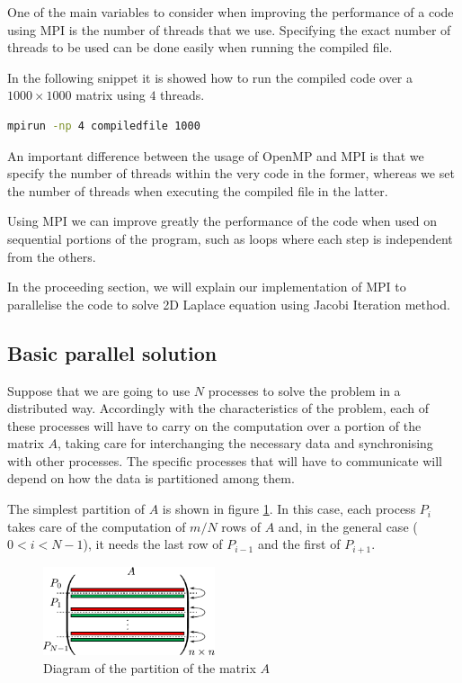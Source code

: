 One of the main variables to consider when improving the performance of a code using MPI is the number of threads that we use. Specifying the exact number of threads to be used can be done easily when running the compiled  file. 

In the following snippet it is showed how to run the compiled code over a $1000 \times 1000$ matrix using $4$ threads.

\begin{lstlisting}[language=bash]
mpirun -np 4 compiledfile 1000
\end{lstlisting}

An important difference between the usage of OpenMP and MPI is that we specify the number of threads within the very code in the former, whereas we set the number of threads when executing the compiled file in the latter.

Using MPI we can improve greatly the performance of the code when used on sequential portions of the program, such as loops where each step is independent from the others.

\bigskip

In the proceeding section, we will explain our implementation of MPI to parallelise the code to solve 2D Laplace equation using Jacobi Iteration method.

\subsection{Basic parallel solution}

Suppose that we are going to use $N$ processes to solve the problem in a distributed way. Accordingly with the characteristics of the problem, each of these processes will have to carry on the computation over a portion of the matrix $A$, taking care for interchanging the necessary data and synchronising with other processes. The specific processes that will have to communicate will depend on how the data is partitioned among them.

The simplest partition of $A$ is shown in figure \ref{fig:a-matrix}. In this case, each process $P_{i}$ takes care of the computation of $m/N$ rows of $A$ and, in the general case ($0 < i < N-1$), it needs the last row of $P_{i-1}$ and the first of $P_{i+1}$.

\begin{figure}[H]
    \centering
    \includegraphics[width=0.45\textwidth]{images/a-matrix}
    \caption{Diagram of the partition of the matrix $A$}
    \label{fig:a-matrix}
\end{figure}

